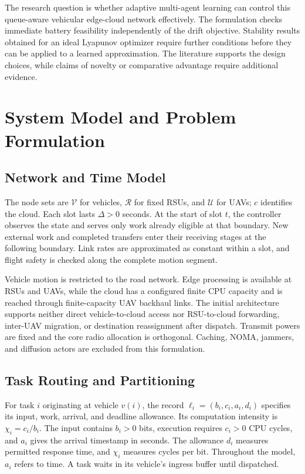 \documentclass[journal]{IEEEtran}
\begin{document}
The research question is whether adaptive multi-agent learning can control this queue-aware vehicular edge-cloud network effectively. The formulation checks immediate battery feasibility independently of the drift objective. Stability results obtained for an ideal Lyapunov optimizer require further conditions before they can be applied to a learned approximation. The literature supports the design choices, while claims of novelty or comparative advantage require additional evidence.

\section{System Model and Problem Formulation}
\label{system_model}
\subsection{Network and Time Model}
\label{subsec:network_model}
The node sets are $\mathcal V$ for vehicles, $\mathcal R$ for fixed RSUs, and $\mathcal U$ for UAVs; $c$ identifies the cloud. Each slot lasts $\Delta>0$ seconds. At the start of slot $t$, the controller observes the state and serves only work already eligible at that boundary. New external work and completed transfers enter their receiving stages at the following boundary. Link rates are approximated as constant within a slot, and flight safety is checked along the complete motion segment.

Vehicle motion is restricted to the road network. Edge processing is available at RSUs and UAVs, while the cloud has a configured finite CPU capacity and is reached through finite-capacity UAV backhaul links. The initial architecture supports neither direct vehicle-to-cloud access nor RSU-to-cloud forwarding, inter-UAV migration, or destination reassignment after dispatch. Transmit powers are fixed and the core radio allocation is orthogonal. Caching, NOMA, jammers, and diffusion actors are excluded from this formulation.

\subsection{Task Routing and Partitioning}
\label{subsec:task_model}
For task $i$ originating at vehicle $v(i)$, the record $\ell_i=(b_i,c_i,a_i,d_i)$ specifies its input, work, arrival, and deadline allowance. Its computation intensity is $\chi_i=c_i/b_i$. The input contains $b_i>0$ bits, execution requires $c_i>0$ CPU cycles, and $a_i$ gives the arrival timestamp in seconds. The allowance $d_i$ measures permitted response time, and $\chi_i$ measures cycles per bit. Throughout the model, $a_i$ refers to time. A task waits in its vehicle's ingress buffer until dispatched.
\end{document}
